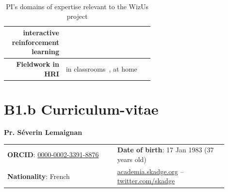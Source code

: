 \documentclass[11pt,a4paper]{report}
\newcommand{\project}{WizUs\xspace}
\newcommand{\eu}[1]{}
\begin{document}
\begin{table}[h]
\begin{tabular}{rp{0.6\linewidth}}
        interactive reinforcement learning & \small \cite{senft2017leveraging,senft2017supervised, senft2019teaching} \\
        \midrule
        \textbf{Fieldwork in HRI} & \small in
        classrooms~\cite{hood2015when, lemaignan2016learning, jacq2016building,
        baxter2015wider,kennedy2016cautious,senft2018robots}, at home~\cite{mondada2015ranger}\\
        \bottomrule
    \end{tabular}
    \caption{\small PI's domains of expertise relevant to the \project project}
    \label{pi-expertise}
\end{table}



\newpage

\printbibliography





\newpage

\chapter{B1.b Curriculum-vitae}\label{the-principal-investigator}


{\LARGE \bf Pr. Séverin Lemaignan}

\vspace{2em}

\begin{tabular}{p{0.45\linewidth}p{0.45\linewidth}}
    \textbf{ORCID}:
    \href{http://orcid.org/0000-0002-3391-8876}{0000-0002-3391-8876} & \textbf{Date of birth}: 17 Jan 1983 (37 years old) \\
\textbf{Nationality}: French & \href{https://academia.skadge.org}{academia.skadge.org} -- \href{https://twitter.com/skadge}{twitter.com/skadge}
\end{tabular}
\end{document}
